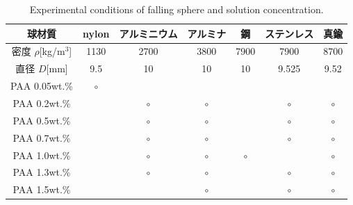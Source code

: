 \begin{table}[h]
    \centering
    \caption{Experimental conditions of falling sphere and solution concentration.}
    \label{table:exp-conditions}
    \begin{tabular}{c|c|c|c|c|c|c}\hline
        球材質                & nylon   & アルミニウム & アルミナ & 鋼      & ステンレス & 真鍮    \\ \hline
        密度 $\rho$[kg/m$^3$] & 1130    & 2700         & 3800     & 7900    & 7900       & 8700    \\ \hline
        直径 $D$[mm]          & 9.5     & 10           & 10       & 10      & 9.525      & 9.52    \\ \hline \hline
        PAA 0.05wt.\%         & $\circ$ &              &          &         &            &         \\ \hline
        PAA 0.2wt.\%          &         & $\circ$      & $\circ$  &         & $\circ$    & $\circ$ \\ \hline
        PAA 0.5wt.\%          &         & $\circ$      & $\circ$  &         & $\circ$    & $\circ$ \\ \hline
        PAA 0.7wt.\%          &         & $\circ$      & $\circ$  &         & $\circ$    & $\circ$ \\ \hline
        PAA 1.0wt.\%          &         & $\circ$      & $\circ$  & $\circ$ &            & $\circ$ \\ \hline
        PAA 1.3wt.\%          &         & $\circ$      & $\circ$  &         & $\circ$    & $\circ$ \\ \hline
        PAA 1.5wt.\%          &         &              & $\circ$  &         & $\circ$    & $\circ$ \\ \hline
    \end{tabular}
\end{table}

